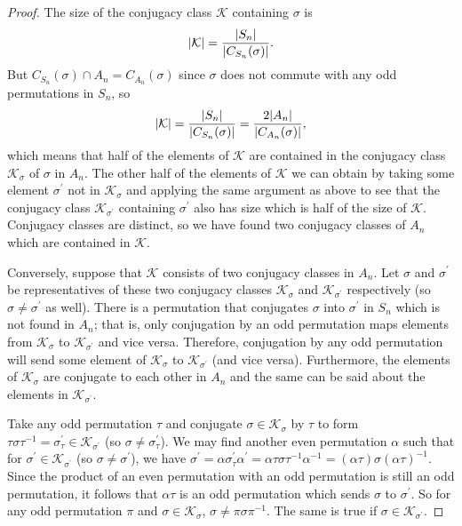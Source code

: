 \documentclass[11pt]{article}
\begin{document}
\begin{enumerate}
\begin{proof}
      The size of the conjugacy class $\mathcal{K}$ containing $\sigma$ is \[\abs{\mathcal{K}} = \frac{\abs{S_n}}{\abs{C_{S_n}(\sigma)}}.\] But $C_{S_n}(\sigma)\cap A_n = C_{A_n}(\sigma)$ since $\sigma$ does not commute with any odd permutations in $S_n$, so \[\abs{\mathcal{K}} = \frac{\abs{S_n}}{\abs{C_{S_n}(\sigma)}} = \frac{2\abs{A_n}}{\abs{C_{A_n}(\sigma)}},\] which means that half of the elements of $\mathcal{K}$ are contained in the conjugacy class $\mathcal{K}_{\sigma}$ of $\sigma$ in $A_n$. The other half of the elements of $\mathcal{K}$ we can obtain by taking some element $\sigma^{\prime}$ not in $\mathcal{K}_{\sigma}$ and applying the same argument as above to see that the conjugacy class $\mathcal{K}_{\sigma^{\prime}}$ containing $\sigma^{\prime}$ also has size which is half of the size of $\mathcal{K}$. Conjugacy classes are distinct, so we have found two conjugacy classes of $A_n$ which are contained in $\mathcal{K}$.

      Conversely, suppose that $\mathcal{K}$ consists of two conjugacy classes in $A_n$. Let $\sigma$ and $\sigma^{\prime}$ be representatives of these two conjugacy classes $\mathcal{K}_{\sigma}$ and $\mathcal{K}_{\sigma^{\prime}}$ respectively (so $\sigma \neq \sigma^{\prime}$ as well). There is a permutation that conjugates $\sigma$ into $\sigma^{\prime}$ in $S_n$ which is not found in $A_n$; that is, only conjugation by an odd permutation maps elements from $\mathcal{K}_{\sigma}$ to $\mathcal{K}_{\sigma^{\prime}}$ and vice versa. Therefore, conjugation by any odd permutation will send some element of $\mathcal{K}_{\sigma}$ to $\mathcal{K}_{\sigma^{\prime}}$ (and vice versa). Furthermore, the elements of $\mathcal{K}_{\sigma}$ are conjugate to each other in $A_n$ and the same can be said about the elements in $\mathcal{K}_{\sigma^{\prime}}$. 
      
      Take any odd permutation $\tau$ and conjugate $\sigma\in \mathcal{K}_{\sigma}$ by $\tau$ to form $\tau \sigma \tau^{-1} = \sigma^{\prime}_\tau\in \mathcal{K}_{\sigma^{\prime}}$ (so $\sigma \neq \sigma^{\prime}_\tau$). We may find another even permutation $\alpha$ such that for $\sigma^{\prime}\in \mathcal{K}_{\sigma^{\prime}}$ (so $\sigma \neq \sigma^{\prime}$), we have $\sigma^{\prime} = \alpha \sigma^{\prime}_\tau \alpha^{\prime} = \alpha \tau \sigma \tau^{-1}\alpha^{-1} = ( \alpha \tau)\sigma ( \alpha \tau)^{-1}$. Since the product of an even permutation with an odd permutation is still an odd permutation, it follows that $ \alpha \tau$ is an odd permutation which sends $\sigma$ to $\sigma^{\prime}$. So for any odd permutation $\pi$ and $\sigma\in \mathcal{K}_{\sigma}$, $\sigma \neq \pi \sigma \pi^{-1}$. The same is true if $\sigma \in \mathcal{K}_{\sigma^{\prime}}$.
      

\end{proof}
\end{enumerate}
\end{document}
